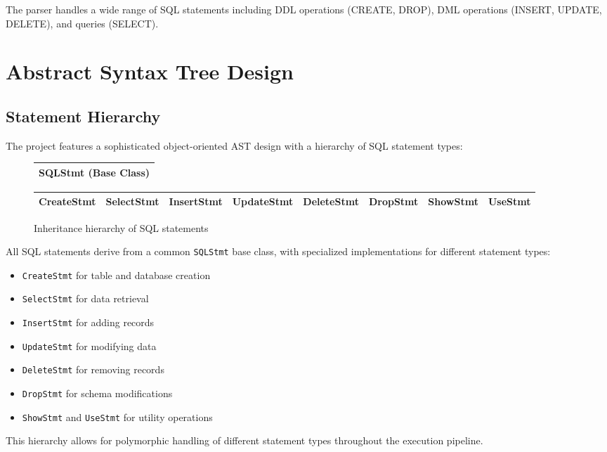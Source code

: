 \documentclass[12pt,a4paper]{article}
\begin{document}
The parser handles a wide range of SQL statements including DDL operations (CREATE, DROP), DML operations (INSERT, UPDATE, DELETE), and queries (SELECT).

\section{Abstract Syntax Tree Design}
\subsection{Statement Hierarchy}
The project features a sophisticated object-oriented AST design with a hierarchy of SQL statement types:

\begin{figure}[H]
\centering
\begin{tabular}{|c|}
\hline
\textbf{SQLStmt (Base Class)} \\
\hline
\end{tabular}
\newline
\newline
\begin{tabular}{|c|c|c|c|c|c|c|c|}
\hline
CreateStmt & SelectStmt & InsertStmt & UpdateStmt & DeleteStmt & DropStmt & ShowStmt & UseStmt \\
\hline
\end{tabular}
\caption{Inheritance hierarchy of SQL statements}
\end{figure}

All SQL statements derive from a common \texttt{SQLStmt} base class, with specialized implementations for different statement types:

\begin{itemize}
    \item \texttt{CreateStmt} for table and database creation
    \item \texttt{SelectStmt} for data retrieval
    \item \texttt{InsertStmt} for adding records
    \item \texttt{UpdateStmt} for modifying data
    \item \texttt{DeleteStmt} for removing records
    \item \texttt{DropStmt} for schema modifications
    \item \texttt{ShowStmt} and \texttt{UseStmt} for utility operations
\end{itemize}

This hierarchy allows for polymorphic handling of different statement types throughout the execution pipeline.
\end{document}
